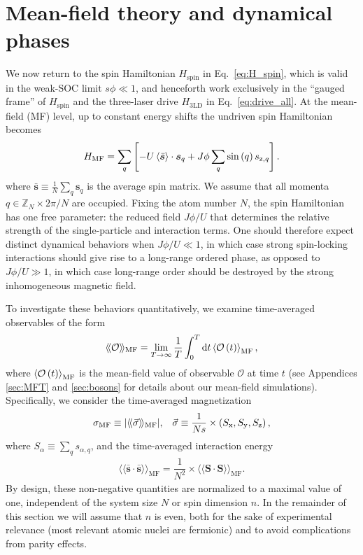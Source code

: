 \documentclass[nofootinbib,twocolumn]{revtex4-2}
\renewcommand{\t}{\text} %
\newcommand{\f}[2]{\dfrac{#1}{#2}} %
\newcommand{\p}[1]{\left(#1\right)} %
\renewcommand{\sp}[1]{\left[#1\right]} %
\newcommand{\bk}{\Braket} %
\renewcommand{\v}{\bm} %
\renewcommand{\c}{\cdot} %
\renewcommand{\dd}{\text{d}} %
\newcommand{\bbk}[1]{\langle\!\langle #1 \rangle\!\rangle}
\newcommand{\1}{\mathds{1}}
\newcommand{\x}{\text{x}}
\newcommand{\y}{\text{y}}
\newcommand{\z}{\text{z}}
\newcommand{\ZZ}{\mathbb{Z}}
\renewcommand{\O}{\mathcal{O}}
\newcommand{\spin}{\text{spin}}
\newcommand{\MF}{\text{MF}}
\renewcommand{\ss}{\bar{\v s}\c\bar{\v s}}
\begin{document}
\section{Mean-field theory and dynamical phases}
\label{sec:mean_field}

We now return to the spin Hamiltonian $H_\spin$ in Eq.~\eqref{eq:H_spin}, which is valid in the weak-SOC limit $s\phi\ll1$, and henceforth work exclusively in the ``gauged frame'' of $H_\spin$ and the three-laser drive $H_{\t{3LD}}$ in Eq.~\eqref{eq:drive_all}.
At the mean-field (MF) level, up to constant energy shifts the undriven spin Hamiltonian becomes
\begin{align}
  H_\MF = \sum_q\sp{-U\bk{\bar{\v s}}\c\v s_q
    + J\phi \sum_q \sin\p{q} s_{\z,q}}.
  \label{eq:H_MF}
\end{align}
where $\bar{\v s}\equiv\frac1N\sum_q\v s_q$ is the average spin matrix.
We assume that all momenta $q\in\ZZ_N\times 2\pi/N$ are occupied.
Fixing the atom number $N$, the spin Hamiltonian has one free parameter: the reduced field $J\phi/U$ that determines the relative strength of the single-particle and interaction terms.
One should therefore expect distinct dynamical behaviors when $J\phi/U\ll1$, in which case strong spin-locking interactions should give rise to a long-range ordered phase, as opposed to $J\phi/U\gg1$, in which case long-range order should be destroyed by the strong inhomogeneous magnetic field.

To investigate these behaviors quantitatively, we examine time-averaged observables of the form
\begin{align}
  \bbk{\O}_\MF = \lim_{T\to\infty} \f1T \int_0^T \dd t \bk{\O\p{t}}_\MF,
\end{align}
where $\bk{\O\p{t}}_\MF$ is the mean-field value of observable $\O$ at time $t$ (see Appendices \ref{sec:MFT} and \ref{sec:bosons} for details about our mean-field simulations).
Specifically, we consider the time-averaged magnetization
\begin{align}
  \sigma_\MF \equiv \abs{\bbk{\vec\sigma}_\MF},
  &&
  \vec\sigma \equiv \f1{Ns} \times \p{S_\x,S_\y,S_\z},
\end{align}
where $S_\alpha \equiv \sum_q s_{\alpha,q}$, and the time-averaged interaction energy
\begin{align}
  \bbk{\ss}_\MF = \f1{N^2} \times \bbk{\v S\c\v S}_\MF.
\end{align}
By design, these non-negative quantities are normalized to a maximal value of one, independent of the system size $N$ or spin dimension $n$.
In the remainder of this section we will assume that $n$ is even, both for the sake of experimental relevance (most relevant atomic nuclei are fermionic) and to avoid complications from parity effects.
\end{document}
